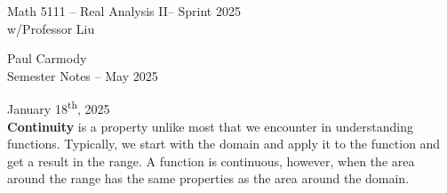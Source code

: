\documentclass[10pt,a4paper]{report}
\newcommand{\CLASSNAME}{Math 5111 -- Real Analysis II}
\newcommand{\STUDENTNAME}{Paul Carmody}
\newcommand{\ASSIGNMENT}{Semester Notes }
\newcommand{\DUEDATE}{May 2025}
\newcommand{\SEMESTER}{Sprint 2025}
\newcommand{\ts}{\textsuperscript}
\begin{document}
\begin{center}
	\Large{\CLASSNAME -- \SEMESTER} \\
	\large{ w/Professor Liu}
\end{center}
\begin{center}
	\STUDENTNAME \\
	\ASSIGNMENT -- \DUEDATE\\
\end{center} 

\noindent January 18\ts{th}, 2025\\

\noindent \textbf{Continuity} is a property unlike most that we encounter in understanding functions.  Typically, we start with the domain and apply it to the function and get a result in the range.  A function is continuous, however, when the area around the range has the same properties as the area around the domain.
\end{document}
